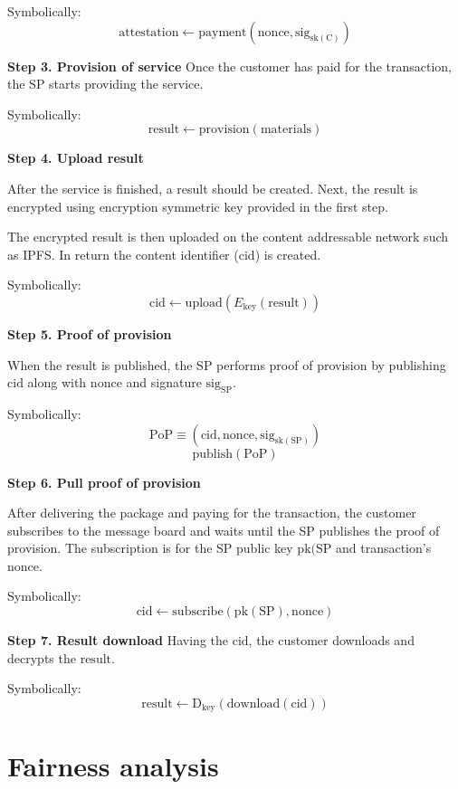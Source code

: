 \documentclass{ieeeaccess}
\begin{document}
Symbolically: 
\[
\mathrm{attestation} \gets \mathrm{payment}(\mathrm{nonce}, \mathrm{sig}_{\mathrm{sk}(\mathrm{C})})
\]

\noindent \textbf
{Step 3. Provision of service}\label{step-3-provision-of-service} 
Once the customer has paid for the transaction, the SP starts providing the service.

Symbolically: 
\[
\mathrm{result} \gets \mathrm{provision}(\mathrm{materials})
\]

\noindent \textbf
{Step 4. Upload result }\label{step-4-results-upload}

After the service is finished, a result should be created. Next, the result is encrypted using encryption symmetric $\mathrm{key}$ provided in the first step.

The encrypted result is then uploaded on the content addressable network such as IPFS. In return the content identifier ($\mathrm{cid}$) is created.

Symbolically: 
\[
\mathrm{cid} \gets \mathrm{upload}(E_{\mathrm{key}}(\mathrm{result}))
\]

\noindent \textbf
{Step 5. Proof of provision}\label{step-5-proof-of-provision-publication}

When the result is published, the SP performs proof of provision by publishing $\mathrm{cid}$ along with $\mathrm{nonce}$ and signature $\mathrm{sig}_\mathrm{SP}$.

Symbolically: 
\[
\mathrm{PoP} \equiv (\mathrm{cid}, \mathrm{nonce}, \mathrm{sig}_{\mathrm{sk}(\mathrm{SP})})
\]
\[
\mathrm{publish}(\mathrm{PoP})
\]

\noindent \textbf
{Step 6. Pull proof of provision}\label{step-6-proof-of-provision-notification}

After delivering the package and paying for the transaction, the customer subscribes to the message board and waits until the SP publishes the proof of provision. The subscription is for the SP public key $\mathrm{pk}(\mathrm{SP}$ and transaction's $\mathrm{nonce}$.

Symbolically: 
\[
\mathrm{cid} \gets \mathrm{subscribe}(\mathrm{pk}(\mathrm{SP}), \mathrm{nonce})
\]

\noindent \textbf
{Step 7. Result download}\label{step-7-results-download} 
Having the $\mathrm{cid}$, the customer downloads and decrypts the $\mathrm{result}$.

Symbolically: 
\[
\mathrm{result} \gets \mathrm{D}_{\mathrm{key}}(\mathrm{download}(\mathrm{cid}))
\]


\section{Fairness analysis}\label{sec:fairness-analysis}
\end{document}

